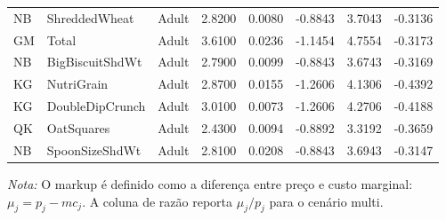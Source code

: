 \begin{table}[H]
\begin{tabular}{@{}llp{}rrrrr@{}}
NB & ShreddedWheat & Adult & 2.8200 & 0.0080 & -0.8843 & 3.7043 & -0.3136 \\
GM & Total & Adult & 3.6100 & 0.0236 & -1.1454 & 4.7554 & -0.3173 \\
NB & BigBiscuitShdWt & Adult & 2.7900 & 0.0099 & -0.8843 & 3.6743 & -0.3169 \\
KG & NutriGrain & Adult & 2.8700 & 0.0155 & -1.2606 & 4.1306 & -0.4392 \\
KG & DoubleDipCrunch & Adult & 3.0100 & 0.0073 & -1.2606 & 4.2706 & -0.4188 \\
QK & OatSquares & Adult & 2.4300 & 0.0094 & -0.8892 & 3.3192 & -0.3659 \\
NB & SpoonSizeShdWt & Adult & 2.8100 & 0.0208 & -0.8843 & 3.6943 & -0.3147 \\
\bottomrule
\end{tabular}

\vspace{0.3em}
\scriptsize
\textit{Nota:} O markup é definido como a diferença entre preço e custo marginal: $\mu_j=p_j-mc_j$. A coluna de razão reporta $\mu_j/p_j$ para o cenário multi.
\end{table}
\endgroup


